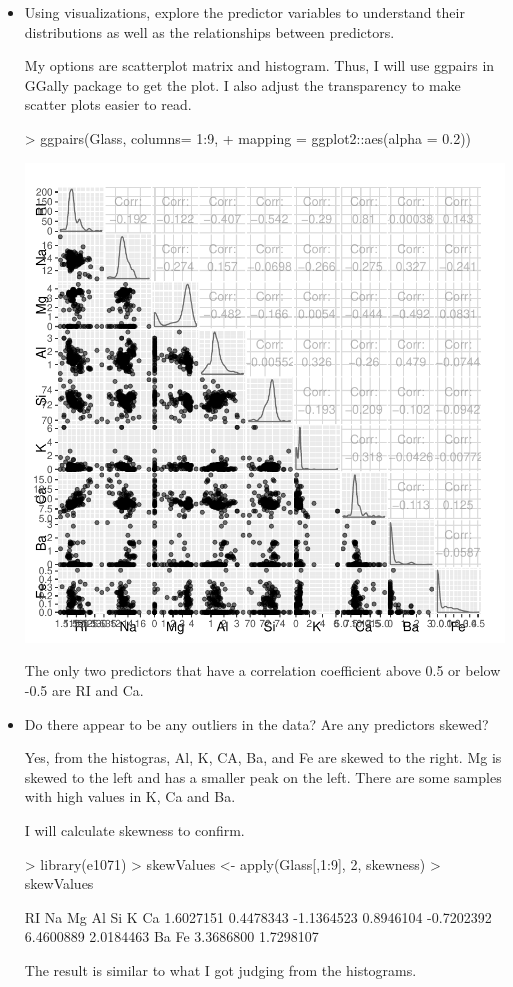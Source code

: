 \documentclass[12pt]{article}
\begin{document}
\begin{itemize}
\item 
Using visualizations, explore the predictor variables to understand their distributions as well as the relationships between predictors.

My options are scatterplot matrix and histogram. Thus, I will use ggpairs in GGally package to get the plot. I also adjust the transparency to make scatter plots easier to read.
\begin{Schunk}
\begin{Sinput}
> ggpairs(Glass, columns= 1:9, 
+         mapping = ggplot2::aes(alpha = 0.2))
\end{Sinput}
\end{Schunk}
\includegraphics{hw3-002}

The only two predictors that have a correlation coefficient above 0.5 or below -0.5 are RI and Ca.

\item
Do there appear to be any outliers in the data? Are any predictors skewed?

Yes, from the histogras, Al, K, CA, Ba, and Fe are skewed to the right. Mg is skewed to the left and has a smaller peak on the left. There are some samples with high values in K, Ca and Ba.

I will calculate skewness to confirm.
\begin{Schunk}
\begin{Sinput}
> library(e1071)
> skewValues <- apply(Glass[,1:9], 2, skewness)
> skewValues
\end{Sinput}
\begin{Soutput}
        RI         Na         Mg         Al         Si          K         Ca 
 1.6027151  0.4478343 -1.1364523  0.8946104 -0.7202392  6.4600889  2.0184463 
        Ba         Fe 
 3.3686800  1.7298107 
\end{Soutput}
\end{Schunk}
The result is similar to what I got judging from the histograms.


\end{itemize}
\end{document}
